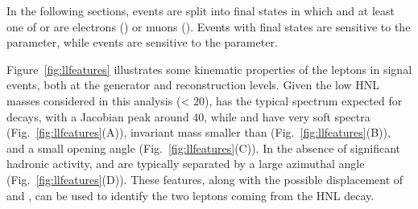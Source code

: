 In the following sections, events are split into  
final states in which \lone and at least one of \ltwo or \lthree are
electrons (\eex) or muons (\mmx).
Events with \eex final states are sensitive to the \mixpare parameter,
while \mmx events are sensitive to the \mixparm parameter.

Figure~\ref{fig:llfeatures} illustrates some
kinematic properties of the leptons in signal events, both at the
generator and reconstruction levels.
Given the low HNL masses considered in this analysis (\mhnl < 20\GeV),
\lone has the typical \pt spectrum expected for \PW decays, with a
Jacobian peak around 40\GeV,
while \ltwo and \lthree have very soft \pt spectra (Fig.~\ref{fig:llfeatures}(A)), invariant mass smaller than \mhnl (Fig.~\ref{fig:llfeatures}(B)), and a small opening angle
(Fig.~\ref{fig:llfeatures}(C)).
In the absence of significant hadronic activity, \lone and \hnl are
typically separated by a large azimuthal angle (Fig.~\ref{fig:llfeatures}(D)).
These features, along with the possible displacement of \ltwo and
\lthree, can be used to identify the two leptons coming from the HNL
decay.

